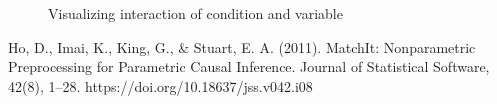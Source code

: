 \documentclass{article}
\begin{document}
\begin{figure}[H]
  \caption{Visualizing interaction of condition and variable}
  \noindent{}
  \centering
\end{figure}

Ho, D., Imai, K., King, G., \& Stuart, E. A. (2011). MatchIt: Nonparametric Preprocessing for Parametric Causal Inference. Journal of Statistical Software, 42(8), 1–28. https://doi.org/10.18637/jss.v042.i08
\end{document}

